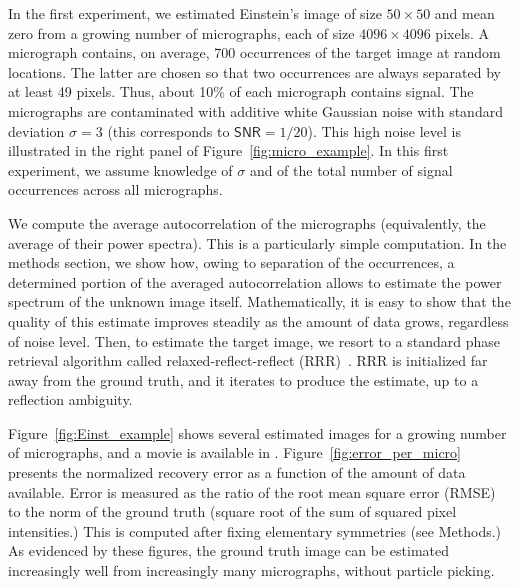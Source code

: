 \documentclass[english,11pt]{article}
\newcommand{\1}{\mathbf{1}}
\newcommand{\TODO}[1]{{\color{red}{[#1]}}}
\numberwithin{equation}{section}
\theoremstyle{plain}
\theoremstyle{definition}
\theoremstyle{remark}
\theoremstyle{plain}
\theoremstyle{remark}
\theoremstyle{plain}
\theoremstyle{plain}
\newcommand{\SNR}{\ensuremath{\textsf{SNR}}}
\begin{document}
In the first experiment, we estimated Einstein's image of size $50\times 50$ and mean zero from a growing number of micrographs, each of size $4096\times 4096$ pixels. A micrograph contains, on average, 700 occurrences of the target image at random locations. The latter are chosen so that two occurrences are always separated by at least 49 pixels. Thus, about 10\% of each micrograph contains signal. The micrographs are contaminated with additive white Gaussian noise with standard deviation $\sigma=3$ (this corresponds to $\SNR=1/20$). This high noise level is illustrated in the right panel of Figure~\ref{fig:micro_example}. In this first experiment, we assume knowledge of $\sigma$ and of the total number of signal occurrences across all micrographs.

We compute the average autocorrelation of the micrographs (equivalently, the average of their power spectra). This is a particularly simple computation. In the methods section, we show how, owing to separation of the occurrences, a determined portion of the averaged autocorrelation allows to estimate the power spectrum of the unknown image itself. Mathematically, it is easy to show that the quality of this estimate improves steadily as the amount of data grows, regardless of noise level. Then, to estimate the target image, we resort to a standard phase retrieval algorithm called relaxed-reflect-reflect (RRR)~\cite{elser2017rrr}. %
RRR is initialized far away from the ground truth, and it iterates to produce the estimate, up to a reflection ambiguity.

Figure~\ref{fig:Einst_example} shows several estimated images for a growing number of micrographs, and a movie is available in \TODO{supplementary material}. Figure~\ref{fig:error_per_micro} presents the normalized recovery error as a function of the amount of data available. Error is measured as the ratio of the root mean square error (RMSE) to the norm of the ground truth (square root of the sum of squared pixel intensities.) This is computed after fixing elementary symmetries (see Methods.) As evidenced by these figures, the ground truth image can be estimated increasingly well from increasingly many micrographs, without particle picking.
\end{document}
